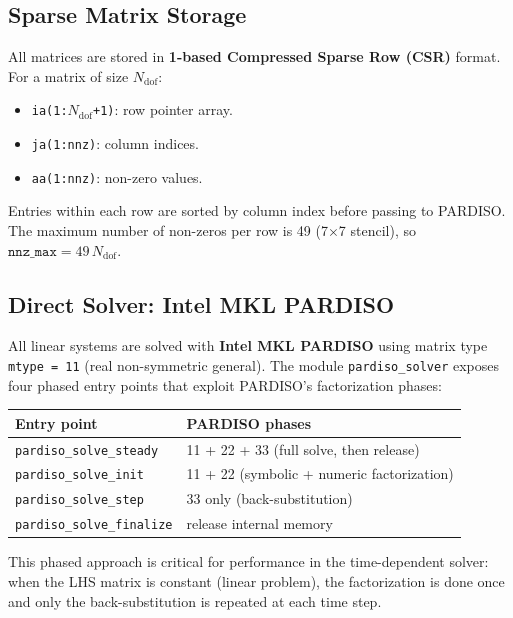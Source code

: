 \documentclass[11pt,a4paper]{article}
\begin{document}
\subsection{Sparse Matrix Storage}

All matrices are stored in \textbf{1-based Compressed Sparse Row (CSR)} format.
For a matrix of size $N_\mathrm{dof}$:
\begin{itemize}
  \item \texttt{ia(1:$N_\mathrm{dof}$+1)}: row pointer array.
  \item \texttt{ja(1:nnz)}: column indices.
  \item \texttt{aa(1:nnz)}: non-zero values.
\end{itemize}
Entries within each row are sorted by column index before passing to PARDISO.
The maximum number of non-zeros per row is 49 (7$\times$7 stencil), so
$\texttt{nnz\_max} = 49\,N_\mathrm{dof}$.

\subsection{Direct Solver: Intel MKL PARDISO}

All linear systems are solved with \textbf{Intel MKL PARDISO} using matrix
type \texttt{mtype = 11} (real non-symmetric general).  The module
\texttt{pardiso\_solver} exposes four phased entry points that exploit
PARDISO's factorization phases:

\begin{center}
\begin{tabular}{ll}
\toprule
Entry point & PARDISO phases \\
\midrule
\texttt{pardiso\_solve\_steady}  & 11 + 22 + 33 (full solve, then release) \\
\texttt{pardiso\_solve\_init}    & 11 + 22 (symbolic + numeric factorization) \\
\texttt{pardiso\_solve\_step}    & 33 only (back-substitution) \\
\texttt{pardiso\_solve\_finalize}& release internal memory \\
\bottomrule
\end{tabular}
\end{center}

This phased approach is critical for performance in the time-dependent solver:
when the LHS matrix is constant (linear problem), the factorization is done
once and only the back-substitution is repeated at each time step.


\end{document}
